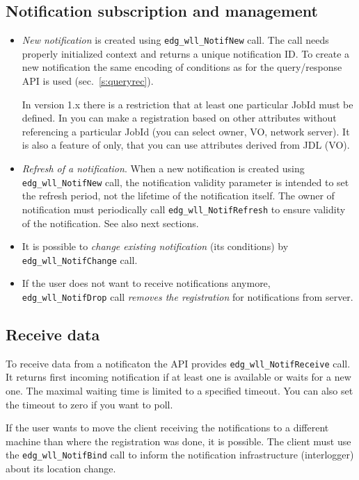 \subsection{Notification subscription and management}
\begin{itemize}
 \item \emph{New notification} is created using
  \verb'edg_wll_NotifNew' call. The call needs properly initialized
  context and returns a unique notification ID. To create a new
  notification the same encoding of conditions as for the \LB
  query/response API is used (sec.~\ref{s:queryrec}). 

  In version 1.x there is a restriction that at least one particular
  JobId must be defined. In  you can make a registration based
  on other attributes without referencing a particular JobId (you can
  select owner, VO, network server).  It is also a feature of 
  only, that you can use attributes derived from JDL (VO).

 \item \emph {Refresh of a notification}. When a new notification is
  created using \verb'edg_wll_NotifNew' call, the notification
  validity parameter is intended to set the refresh period, not the
  lifetime of the notification itself. The owner of notification must
  periodically call \verb'edg_wll_NotifRefresh' to ensure validity of
  the notification. See also next sections.

 \item It is possible to \emph{change existing notification} (its conditions) by
  \verb'edg_wll_NotifChange' call.

 \item If the user does not want to receive notifications anymore,
  \verb'edg_wll_NotifDrop' call \emph{removes the registration} for
  notifications from \LB server.
\end{itemize}

\subsection{Receive data}
To receive data from a notificaton the API provides
\verb'edg_wll_NotifReceive' call. It returns first incoming
notification if at least one is available or waits for a new one. The
maximal waiting time is limited to a specified timeout. You can also set the
timeout to zero if you want to poll.

If the user wants to move the client receiving the notifications to a different
machine than where the registration was done, it is possible. The
client must use the \verb'edg_wll_NotifBind' call to inform the
notification infrastructure (interlogger) about its location change.

